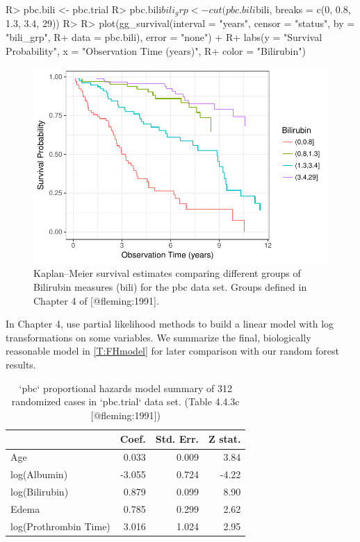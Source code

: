 \documentclass[article, nojss]{jss}
\begin{document}
\begin{Schunk}
\begin{Sinput}
R> pbc.bili <- pbc.trial
R> pbc.bili$bili_grp <- cut(pbc.bili$bili, breaks = c(0, 0.8, 1.3, 3.4, 29))
R>
R> plot(gg_survival(interval = "years", censor = "status", by = "bili_grp",
R+                  data = pbc.bili), error = "none") +
R+   labs(y = "Survival Probability", x = "Observation Time (years)",
R+        color = "Bilirubin")
\end{Sinput}
\begin{figure}[!htb]

{\centering \includegraphics{rfs-gg_survival-bili-1}

}

\caption[Kaplan--Meier survival estimates comparing different groups of Bilirubin measures (bili) for the pbc data set]{Kaplan--Meier survival estimates comparing different groups of Bilirubin measures (bili) for the pbc data set. Groups defined in Chapter 4 of [@fleming:1991].}\label{fig:gg_survival-bili}
\end{figure}
\end{Schunk}

In Chapter 4,\citep{fleming:1991} use partial likelihood methods to
build a linear model with log transformations on some variables. We
summarize the final, biologically reasonable model in
\autoref{T:FHmodel} for later comparison with our random forest results.

\begin{table}

\caption{\label{tab:xtab}`pbc` proportional hazards model summary of 312 randomized cases in `pbc.trial` data set.  (Table 4.4.3c [@fleming:1991])\label{T:FHmodel}}
\centering
\begin{tabular}[t]{l|r|r|r}
\hline
  & Coef. & Std. Err. & Z stat.\\
\hline
Age & 0.033 & 0.009 & 3.84\\
\hline
log(Albumin) & -3.055 & 0.724 & -4.22\\
\hline
log(Bilirubin) & 0.879 & 0.099 & 8.90\\
\hline
Edema & 0.785 & 0.299 & 2.62\\
\hline
log(Prothrombin Time) & 3.016 & 1.024 & 2.95\\
\hline
\end{tabular}
\end{table}
\end{document}
